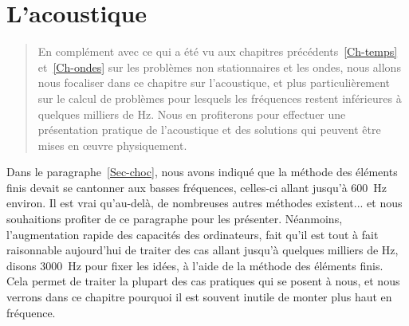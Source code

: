 \chapter{L'acoustique}\label{Ch-Acous}
\begin{abstract}
En complément avec ce qui a été vu aux chapitres précédents~\ref{Ch-temps} et~\ref{Ch-ondes} sur les problèmes non stationnaires et les ondes, nous allons nous focaliser dans ce chapitre sur l'acoustique, et plus particulièrement sur le calcul de problèmes pour lesquels les fréquences restent inférieures à quelques milliers de Hz. Nous en profiterons pour effectuer une présentation pratique de l'acoustique et des solutions qui peuvent être mises en œuvre physiquement.
\end{abstract}

\medskip
Dans le paragraphe~\ref{Sec-choc}, nous avons indiqué que la méthode des éléments finis devait se cantonner aux basses fréquences, celles-ci allant jusqu'à 600~Hz environ. Il est vrai qu'au-delà, de nombreuses autres méthodes existent... et nous souhaitions profiter de ce paragraphe pour les présenter.
Néanmoins, l'augmentation rapide des capacités des ordinateurs, fait qu'il est tout à fait raisonnable aujourd'hui de traiter des cas allant jusqu'à quelques milliers de Hz, disons 3000~Hz pour fixer les idées, à l'aide de la méthode des éléments finis. Cela permet de traiter la plupart des cas pratiques qui se posent à nous, et nous verrons dans ce chapitre pourquoi il est souvent inutile de monter plus haut en fréquence.

\medskip

